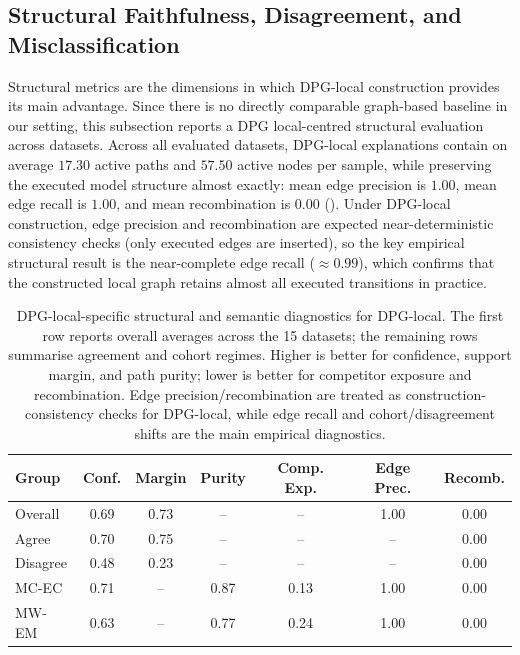 \documentclass[runningheads]{llncs}
\begin{document}
\subsection{Structural Faithfulness, Disagreement, and Misclassification}

Structural metrics are the dimensions in which DPG-local construction
provides its main advantage. Since there is no directly comparable graph-based baseline in our setting, this subsection reports a DPG local-centred structural evaluation across datasets. Across all evaluated datasets, DPG-local explanations contain on average $17.30$ active paths and $57.50$ active nodes per sample, while preserving the executed model structure almost exactly: mean edge precision is $1.00$, mean edge recall is $1.00$, and mean recombination is $0.00$ (). Under DPG-local construction, edge precision and recombination are expected near-deterministic consistency checks (only executed edges are inserted), so the key empirical structural result is the near-complete edge recall ($\approx 0.99$), which confirms that the constructed local graph retains almost all executed transitions in practice.

\begin{table}[t]
\centering
\small
\caption{DPG-local-specific structural and semantic diagnostics for
DPG-local. The first row reports overall averages across the 15 datasets; the remaining rows summarise agreement and cohort regimes. Higher is better for confidence, support margin, and path purity; lower is better for competitor exposure and recombination. Edge precision/recombination are treated as construction-consistency checks for DPG-local, while edge recall and cohort/disagreement shifts are the main empirical diagnostics.}
\label{tab:dpg-structural}
\begin{tabular}{lcccccc}
\toprule
Group & Conf. & Margin & Purity & Comp. Exp. & Edge Prec. & Recomb. \\
\midrule
Overall & 0.69 & 0.73 & -- & -- & 1.00 & 0.00 \\
Agree & 0.70 & 0.75 & -- & -- & -- & 0.00 \\
Disagree & 0.48 & 0.23 & -- & -- & -- & 0.00 \\
MC-EC & 0.71 & -- & 0.87 & 0.13 & 1.00 & 0.00 \\
MW-EM & 0.63 & -- & 0.77 & 0.24 & 1.00 & 0.00 \\
\bottomrule
\end{tabular}
\end{table}
\end{document}
